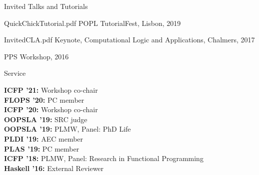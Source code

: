 \documentclass{resume} %
\begin{document}
\begin{rSection}{Invited Talks and Tutorials}

    {}
    {}
  
    {QuickChickTutorial.pdf}
    {POPL TutorialFest, Lisbon, 2019}

     {}
     {}

     {}
     {}
     
     {InvitedCLA.pdf}
     {Keynote, Computational Logic and Applications, Chalmers, 2017}

     {}
     {}

     {}
     {PPS Workshop, 2016}

     {}
     {}
     
     
\end{rSection}


\newcommand{\serve}[2]{
  {\bf #1:} #2 \\
  }


\begin{rSection}{Service}

  \serve{ICFP '21}{Workshop co-chair}
  \serve{FLOPS '20}{PC member}
  \serve{ICFP '20}{Workshop co-chair}
  \serve{OOPSLA '19}{SRC judge}
  \serve{OOPSLA '19}{PLMW, Panel: PhD Life}
  \serve{PLDI '19}{AEC member}
  \serve{PLAS '19}{PC member}
  \serve{ICFP '18}{PLMW, Panel: Research in Functional Programming}
  \serve{Haskell '16}{External Reviewer}
  
\end{rSection}


\end{document}
